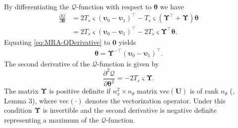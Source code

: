\documentclass[review,authoryear,3p]{elsarticle}
\begin{document}
By differentiating the $\mathcal Q$-function with respect to $\boldsymbol\theta$ we have
\begin{align}\label{eq:MRA-QDerivative}
\frac{\partial \mathcal Q}{\partial \boldsymbol\theta}&=2T_s\varsigma(\boldsymbol\upsilon_0-\boldsymbol\upsilon_1)^\top-T_s\varsigma(\boldsymbol\Upsilon^\top+\boldsymbol\Upsilon)\boldsymbol\theta \nonumber \\
&=2T_s\varsigma(\boldsymbol\upsilon_0-\boldsymbol\upsilon_1)^\top-2T_s\varsigma\boldsymbol\Upsilon^\top\boldsymbol\theta.
\end{align}
Equating \eqref{eq:MRA-QDerivative} to $\mathbf 0$ yields
\begin{align}\label{eq:MRA-thetahat}
\boldsymbol \theta= \boldsymbol\Upsilon^{-\top}(\boldsymbol\upsilon_0-\boldsymbol\upsilon_1)^\top.
\end{align}
The second derivative of the $\mathcal Q$-function is given by
\begin{equation}
\frac{\partial^2\mathcal Q}{\partial\boldsymbol\theta^2}=-2T_s\varsigma\boldsymbol\Upsilon.
\end{equation}
The matrix $\boldsymbol\Upsilon$ is positive definite if $n_x^2\times n_{\theta}$ matrix $\mathrm{vec}(\mathbf U)$ is of rank $n_{\theta}$ (\citep{Dewar2009}, Lemma 3), where $\mathrm{vec}(\cdot)$ denotes the vectorization operator. Under this condition $\boldsymbol\Upsilon$ is  invertible and the second derivative is negative definite representing a maximum of the $\mathcal Q$-function. 
\end{document}
